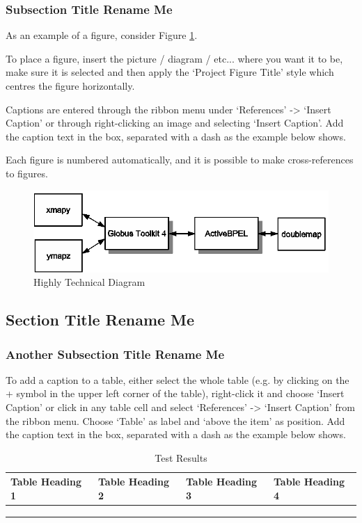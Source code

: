 \documentclass[a4paper,11pt]{bgwork}
\begin{document}
\subsubsection{Subsection Title Rename Me}
As an example of a figure, consider Figure \ref{fig:diagram}.

To place a figure, insert the picture / diagram / etc... where you want it to be, make sure it is selected and then apply the ‘Project Figure Title’ style which centres the figure horizontally.

Captions are entered through the ribbon menu under ‘References’ -> ‘Insert Caption’ or through right-clicking an image and selecting ‘Insert Caption’. Add the caption text in the box, separated with a dash as the example below shows.

Each figure is numbered automatically, and it is possible to make cross-references to figures.


\begin{figure}[h]
\centering
\includegraphics{diagram}
\caption{Highly Technical Diagram}
\label{fig:diagram}
\end{figure}

\subsection{Section Title Rename Me}
\subsubsection{Another Subsection Title Rename Me}

To add a caption to a table, either select the whole table (e.g. by clicking on the + symbol in the upper left corner of the table), right-click it and choose ‘Insert Caption’ or click in any table cell and select ‘References’ -> ‘Insert Caption’ from the ribbon menu. Choose ‘Table’ as label and ‘above the item’ as position. Add the caption text in the box, separated with a dash as the example below shows.


\begin{table}[h]
\begin{tabular}{|l|l|l|l|}
    \hline
    Table Heading 1 & Table Heading 2 & Table Heading 3 & Table Heading 4\\
    \hline
    & & &\\
    \hline
    & & &\\
    \hline
    & & &\\
    \hline
\end{tabular}
\caption{Test Results}

\end{table}
\end{document}
